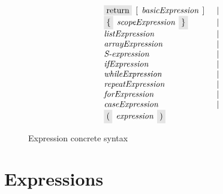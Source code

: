 \begin{figure}[t]
\[\begin{array}{rcll}
                                  &   & \term{return}\s[\s\nonterm{basicExpression}\s]&\alt\\                                 
                                  &   & \term{\{}\s\nonterm{scopeExpression}\s\term{\}}&\alt\\
                                  &   & \nonterm{listExpression}&\alt\\
                                  &   & \nonterm{arrayExpression}&\alt\\
                                  &   & \nonterm{S-expression}&\alt\\
                                  &   & \nonterm{ifExpression}&\alt\\
                                  &   & \nonterm{whileExpression}&\alt\\
                                  &   & \nonterm{repeatExpression}&\alt\\
                                  &   & \nonterm{forExpression}&\alt\\
                                  &   & \nonterm{caseExpression}&\alt\\
                                  &   & \term{(}\s\nonterm{expression}\s\term{)}&
    \end{array}
  \]
  \caption{Expression concrete syntax}
  \label{expressions}
\end{figure}

\section{Expressions}
\label{sec:expressions}

